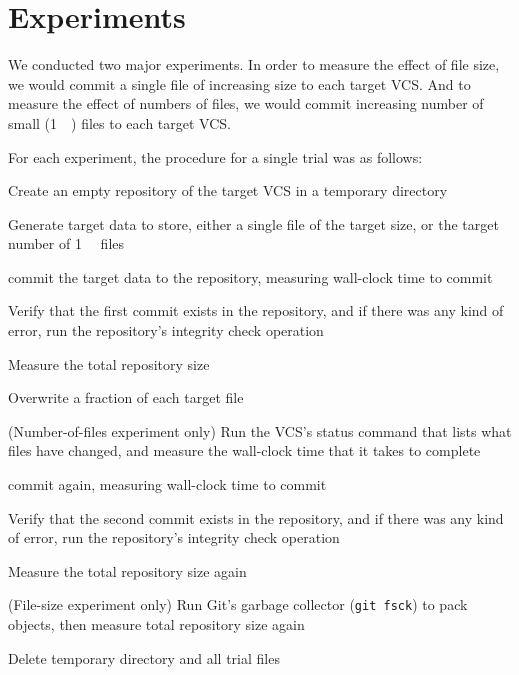\documentclass[
    usenglish,
]{nik}
\begin{document}

\section{Experiments}



We conducted two major experiments.
In order to measure the effect of file size, we would \gls{commit} a single file of increasing size to each target \gls{VCS}.
And to measure the effect of numbers of files, we would \gls{commit} increasing number of small (\SI{1}{\kibi\byte}) files to each target \gls{VCS}.

For each experiment, the procedure for a single trial was as follows:

\begin{tight_enumerate}
    \item Create an empty \gls{repository} of the target \gls{VCS} in a temporary directory
    \item Generate target data to store, either a single file of the target size, or the target number of \SI{1}{\kibi\byte} files
    \item \Gls{commit} the target data to the \gls{repository}, measuring wall-clock time to \gls{commit}
    \item Verify that the first \gls{commit} exists in the \gls{repository}, and if there was any kind of error, run the \gls{repository}'s integrity check operation
    \item Measure the total \gls{repository} size
    \item Overwrite a fraction of each target file
    \item (Number-of-files experiment only) Run the \gls{VCS}'s status command that lists what files have changed, and measure the wall-clock time that it takes to complete
    \item \Gls{commit} again, measuring wall-clock time to \gls{commit}
    \item Verify that the second \gls{commit} exists in the \gls{repository}, and if there was any kind of error, run the \gls{repository}'s integrity check operation
    \item Measure the total \gls{repository} size again
    \item (File-size experiment only) Run Git's garbage collector (\lstinline{git fsck}) to pack objects, then measure total \gls{repository} size again
    \item Delete temporary directory and all trial files
\end{tight_enumerate}
\end{document}
